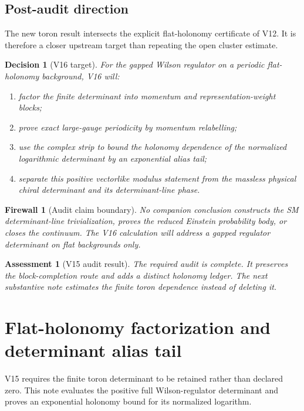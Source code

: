 \documentclass[11pt]{article}
\newtheorem{assessment}[theorem]{Assessment}
\newtheorem{firewall}[theorem]{Firewall}
\newtheorem{decision}[theorem]{Decision}
\begin{document}
\subsection{Post-audit direction}

The new toron result intersects the explicit flat-holonomy certificate of
V12.  It is therefore a closer upstream target than repeating the open
cluster estimate.

\begin{decision}[V16 target]
\label{dec:v11v15-direction}
For the gapped Wilson regulator on a periodic flat-holonomy background,
V16 will:
\begin{enumerate}[label=\textnormal{(\alph*)}]
\item factor the finite determinant into momentum and representation-weight
blocks;
\item prove exact large-gauge periodicity by momentum relabelling;
\item use the complex strip to bound the holonomy dependence of the
normalized logarithmic determinant by an exponential alias tail;
\item separate this positive vectorlike modulus statement from the
massless physical chiral determinant and its determinant-line phase.
\end{enumerate}
\end{decision}

\begin{firewall}[Audit claim boundary]
\label{fw:v11v15-boundary}
No companion conclusion constructs the SM determinant-line
trivialization, proves the reduced Einstein probability body, or closes
the continuum.  The V16 calculation will address a gapped regulator
determinant on flat backgrounds only.
\end{firewall}

\begin{assessment}[V15 audit result]
\label{ass:v11v15}
The required audit is complete.  It preserves the block-completion route
and adds a distinct holonomy ledger.  The next substantive note estimates
the finite toron dependence instead of deleting it.
\end{assessment}


\section{Flat-holonomy factorization and determinant alias tail}
\label{sec:v11v16}

V15 requires the finite toron determinant to be retained rather than
declared zero.  This note evaluates the positive full Wilson-regulator
determinant and proves an exponential holonomy bound for its normalized
logarithm.
\end{document}
